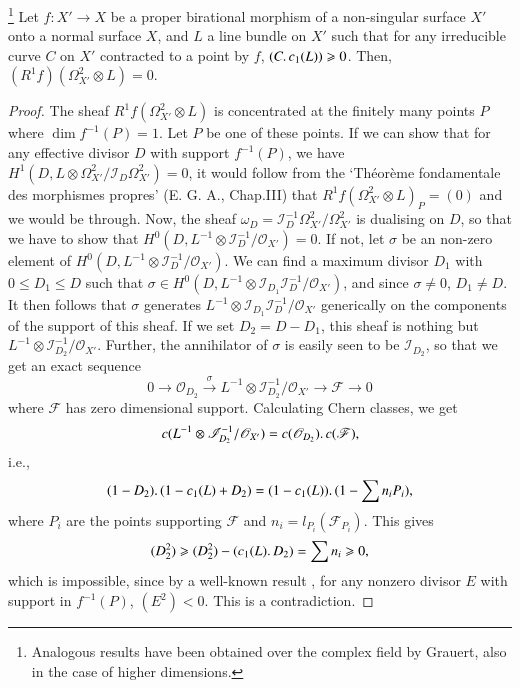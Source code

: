 \begin{lem}\label{art9-lem4}\footnote[3]{Analogous results have been obtained over the complex field by Grauert, also in the case of higher dimensions.}
Let $f: X' \to X$ be a proper birational morphism of a non-singular
surface $X'$ onto a normal surface $X$, and $L$ a line bundle on $X'$
such that for any irreducible curve $C$ on $X'$ contracted to a point
by $f$, $(C\ldotp c_1 (L)) \geqslant 0$. Then, $(R^1 f) (\Omega^2
_{X'} \otimes L) =0$. 
\end{lem}

\begin{proof}
The sheaf $R^1 f (\Omega^2_{X'} \otimes L)$ is concentrated at the finitely many points $P$ where $\dim f^{-1} (P) = 1$. Let $P$ be one of these points. If we can show that for any effective divisor $D$ with support $f^{-1} (P)$, we have $H^1 (D, L \otimes \Omega^{2}_{X'}/ \mathscr{I}_D \Omega^2_{X'}) =0$, it would follow from the `Th\'eor\`eme fondamentale des morphismes propres' (E. G. A., Chap.III) that $R^1 f (\Omega^2_{X'} \otimes L)_P = (0)$ and we would be through. Now, the sheaf $\omega_D = \mathscr{I}^{-1}_D \Omega^2_{X'}/ \Omega^2_{X'}$ is dualising on $D$, so that we have to show that $H^0 (D, L^{-1} \otimes \mathscr{I}^{-1}_D / \mathscr{O}_{X'}) =0$. If not, let $\sigma$ be an non-zero element of $H^0 (D,L^{-1} \otimes \mathscr{I}^{-1}_D / \mathscr{O}_{X'})$. We can find a maximum divisor $D_1$ with $0 \leqslant D_1 \leqslant D$ such that $\sigma \in H^0 (D, L^{-1} \otimes \mathscr{I}_{D_1} \mathscr{I}^{-1}_D/ \mathscr{O}_{X'})$, and since $\sigma \neq 0$, $D_1 \neq D$. It then follows that $\sigma$ generates $L^{-1} \otimes \mathscr{I}_{D_1} \mathscr{I}^{-1}_D / \mathscr{O}_{X'}$ generically on the components of the support of this sheaf. If we set $D_2 = D - D_1$, this sheaf is nothing but $L^{-1} \otimes \mathscr{I}^{-1}_{D_2}/ \mathscr{O}_{X'}$. Further, the annihilator of $\sigma$ is easily seen to be $\mathscr{I}_{D_2}$, so that we get an exact sequence
$$
0 \longrightarrow \mathscr{O}_{D_2} \xrightarrow{~\sigma~} L^{-1} \otimes \mathscr{I}^{-1}_{D_2}/ \mathscr{O}_{X'} \longrightarrow \mathscr{F} \longrightarrow 0
$$
where $\mathscr{F}$ has zero dimensional support. Calculating Chern classes, we get
$$
c (L^{-1} \otimes \mathscr{I}^{-1}_{D_2} /\mathscr{O}_{X'}) = c (\mathscr{O}_{D_2}) \ldotp c(\mathscr{F}),
$$\pageoriginale
i.e.,
$$
(1-D_2) \ldotp (1 - c_1 (L) + D_2) = (1 - c_1 (L))\ldotp (1 - \sum n_i P_i),
$$
where $P_i$ are the points supporting $\mathscr{F}$ and $n_i = l_{P_i} (\mathscr{F}_{P_i})$. This gives
$$
(D^2_2) \geqslant (D^2_2) - (c_1 (L) \ldotp D_2) = \sum n_i \geqslant 0,
$$
which is impossible, since by a well-known result \cite{art9-key9}, for any nonzero divisor $E$ with support in $f^{-1}(P)$, $(E^2)<0$. This is a contradiction.
\end{proof}

